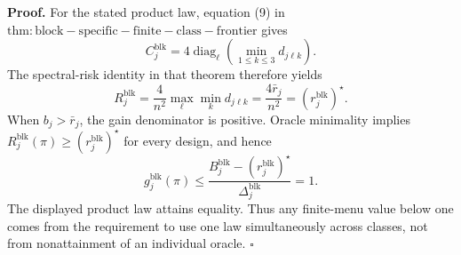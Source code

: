\textbf{Proof.}
For the stated product law, equation (9) in \(\mathrm{thm:block-specific-finite-class-frontier}\) gives
\[
C_j^{\mathrm{blk}}
=4\operatorname{diag}_{\ell}
\left(\min_{1\le k\le3}d_{j\ell k}\right).
\]
The spectral-risk identity in that theorem therefore yields
\[
R_j^{\mathrm{blk}}
=\frac4{n^2}\max_\ell\min_kd_{j\ell k}
=\frac{4\bar r_j}{n^2}
=(r_j^{\mathrm{blk}})^\star.
\]
When \(b_j>\bar r_j\), the gain denominator is positive.  Oracle minimality implies \(R_j^{\mathrm{blk}}(\pi)\ge(r_j^{\mathrm{blk}})^\star\) for every design, and hence
\[
g_j^{\mathrm{blk}}(\pi)
\le
\frac{B_j^{\mathrm{blk}}-(r_j^{\mathrm{blk}})^\star}
{\Delta_j^{\mathrm{blk}}}
=1.
\]
The displayed product law attains equality.  Thus any finite-menu value below one comes from the requirement to use one law simultaneously across classes, not from nonattainment of an individual oracle. \(\square\)